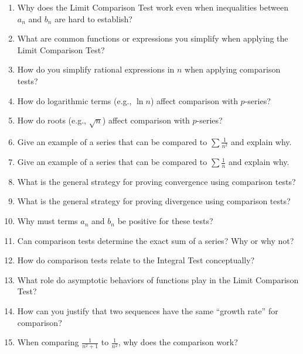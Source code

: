 \begin{enumerate}
  \item Why does the Limit Comparison Test work even when inequalities between \(a_{n}\) and \(b_{n}\) are hard to establish?
  \item What are common functions or expressions you simplify when applying the Limit Comparison Test?
  \item How do you simplify rational expressions in \(n\) when applying comparison tests?
  \item How do logarithmic terms (e.g., \(\ln n\)) affect comparison with \(p\)-series?
  \item How do roots (e.g., \(\sqrt{n}\)) affect comparison with \(p\)-series?
  \item Give an example of a series that can be compared to \(\sum \frac{1}{n^{2}}\) and explain why.
  \item Give an example of a series that can be compared to \(\sum \frac{1}{n}\) and explain why.
  \item What is the general strategy for proving convergence using comparison tests?
  \item What is the general strategy for proving divergence using comparison tests?
  \item Why must terms \(a_{n}\) and \(b_{n}\) be positive for these tests?
  \item Can comparison tests determine the exact sum of a series? Why or why not?
  \item How do comparison tests relate to the Integral Test conceptually?
  \item What role do asymptotic behaviors of functions play in the Limit Comparison Test?
  \item How can you justify that two sequences have the same “growth rate” for comparison?
  \item When comparing \(\frac{1}{n^{2}+1}\) to \(\frac{1}{n^{2}}\), why does the comparison work?
\end{enumerate}

